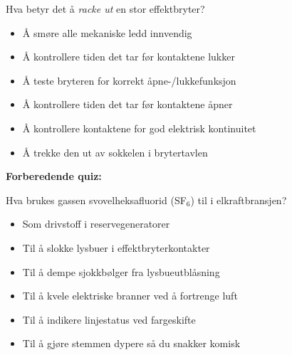 Hva betyr det å {\it racke ut} en stor effektbryter?

\begin{itemize}
\item{} Å smøre alle mekaniske ledd innvendig
\vskip 5pt 
\item{} Å kontrollere tiden det tar før kontaktene lukker
\vskip 5pt 
\item{} Å teste bryteren for korrekt åpne-/lukkefunksjon
\vskip 5pt 
\item{} Å kontrollere tiden det tar før kontaktene åpner
\vskip 5pt 
\item{} Å kontrollere kontaktene for god elektrisk kontinuitet
\vskip 5pt 
\item{} Å trekke den ut av sokkelen i brytertavlen
\end{itemize}










\vfil \eject

\noindent
{\bf Forberedende quiz:}

Hva brukes gassen svovelheksafluorid (SF$_6$) til i elkraftbransjen?

\begin{itemize}
\item{} Som drivstoff i reservegeneratorer
\vskip 5pt 
\item{} Til å slokke lysbuer i effektbryterkontakter
\vskip 5pt 
\item{} Til å dempe sjokkbølger fra lysbueutblåsning
\vskip 5pt 
\item{} Til å kvele elektriske branner ved å fortrenge luft
\vskip 5pt 
\item{} Til å indikere linjestatus ved fargeskifte
\vskip 5pt 
\item{} Til å gjøre stemmen dypere så du snakker komisk
\end{itemize}



